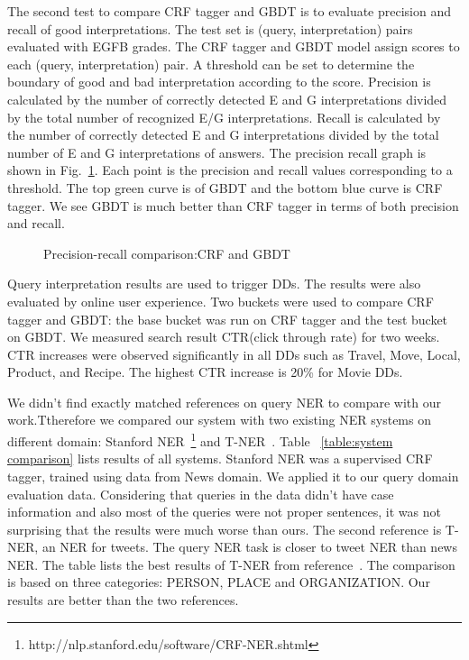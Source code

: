 \documentclass{acm_proc_article-sp}
\begin{document}
The second test to compare CRF tagger and GBDT is to evaluate precision and recall of good interpretations. The test set is (query, interpretation) pairs evaluated with EGFB grades. The CRF tagger and GBDT model assign scores to each (query, interpretation) pair. A threshold can be set to determine the boundary of good and bad interpretation according to the score. Precision is calculated by the number of correctly detected E and G interpretations divided by the total number of recognized E/G interpretations. Recall is calculated by the number of correctly detected E and G interpretations divided by the total number of E and G interpretations of answers. The precision recall graph is shown in Fig.~\ref{fig:precision}. Each point is the precision and recall values corresponding to a threshold. The top green curve is of GBDT and the bottom blue curve is CRF tagger. We see GBDT is much better than CRF tagger in terms of both precision and recall. 


\begin{figure}
\centering
{}
\caption{Precision-recall comparison:CRF and GBDT}
\label{fig:precision}
\end{figure}



Query interpretation results are used to trigger DDs. The results were also evaluated by online user experience. Two buckets were used to compare CRF tagger and GBDT: the base bucket was run on CRF tagger and the test bucket on GBDT. We measured search result CTR(click through rate) for two weeks. CTR increases were observed significantly in all DDs such as Travel, Move, Local, Product, and Recipe. The highest CTR increase is 20\% for Movie DDs. 


We didn't find exactly matched references on query NER to compare with our work.Ttherefore we compared our system with two existing NER systems on different domain: Stanford NER~\footnote{http://nlp.stanford.edu/software/CRF-NER.shtml} and T-NER~\cite{Ritter:2011}. Table ~\ref{table:system comparison} lists results of all systems. Stanford NER was a supervised CRF tagger, trained using data from News domain. We applied it to our query domain evaluation data. Considering that queries in the data didn't have case information and also most of the queries were not proper sentences, it was not surprising that the results were much worse than ours. The second reference is T-NER, an NER for tweets. The query NER task is closer to tweet NER than news NER. The table lists the best results of T-NER from reference~\cite{Ritter:2011}. The comparison is based on three categories: PERSON, PLACE and ORGANIZATION. Our results are better than the two references. 
\end{document}
